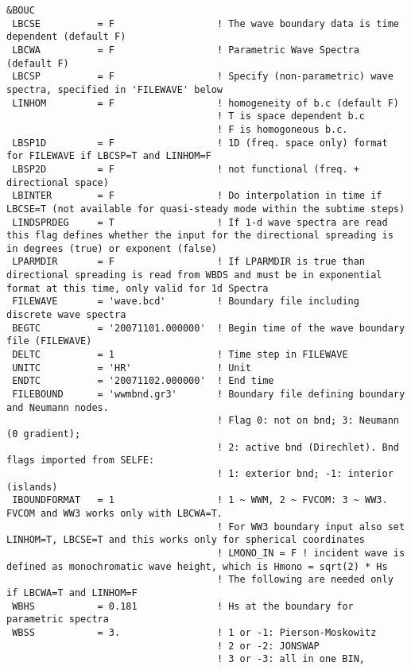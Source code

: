 \documentclass[12pt]{amsart}
\begin{document}
\begin{verbatim}
&BOUC
 LBCSE          = F                  ! The wave boundary data is time dependent (default F)
 LBCWA          = F                  ! Parametric Wave Spectra (default F)
 LBCSP          = F                  ! Specify (non-parametric) wave spectra, specified in 'FILEWAVE' below
 LINHOM         = F                  ! homogeneity of b.c (default F)
                                     ! T is space dependent b.c
                                     ! F is homogoneous b.c.
 LBSP1D         = F                  ! 1D (freq. space only) format for FILEWAVE if LBCSP=T and LINHOM=F
 LBSP2D         = F                  ! not functional (freq. + directional space)
 LBINTER        = F                  ! Do interpolation in time if LBCSE=T (not available for quasi-steady mode within the subtime steps)
 LINDSPRDEG     = T                  ! If 1-d wave spectra are read this flag defines whether the input for the directional spreading is in degrees (true) or exponent (false)
 LPARMDIR       = F                  ! If LPARMDIR is true than directional spreading is read from WBDS and must be in exponential format at this time, only valid for 1d Spectra
 FILEWAVE       = 'wave.bcd'         ! Boundary file including discrete wave spectra
 BEGTC          = '20071101.000000'  ! Begin time of the wave boundary file (FILEWAVE)
 DELTC          = 1                  ! Time step in FILEWAVE
 UNITC          = 'HR'               ! Unit
 ENDTC          = '20071102.000000'  ! End time
 FILEBOUND      = 'wwmbnd.gr3'       ! Boundary file defining boundary and Neumann nodes.
                                     ! Flag 0: not on bnd; 3: Neumann (0 gradient);
                                     ! 2: active bnd (Direchlet). Bnd flags imported from SELFE:
                                     ! 1: exterior bnd; -1: interior (islands)
 IBOUNDFORMAT   = 1                  ! 1 ~ WWM, 2 ~ FVCOM: 3 ~ WW3. FVCOM and WW3 works only with LBCWA=T.
                                     ! For WW3 boundary input also set LINHOM=T, LBCSE=T and this works only for spherical coordinates
                                     ! LMONO_IN = F ! incident wave is defined as monochromatic wave height, which is Hmono = sqrt(2) * Hs
                                     ! The following are needed only if LBCWA=T and LINHOM=F
 WBHS           = 0.181              ! Hs at the boundary for parametric spectra
 WBSS           = 3.                 ! 1 or -1: Pierson-Moskowitz
                                     ! 2 or -2: JONSWAP
                                     ! 3 or -3: all in one BIN,

\end{verbatim}
\end{document}
